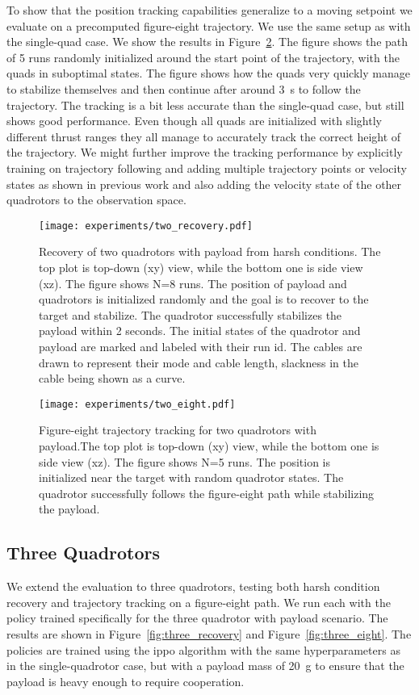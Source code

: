 To show that the position tracking capabilities generalize to a moving setpoint we evaluate on a precomputed figure-eight trajectory. We use the same setup as with the single-quad case. We show the results in Figure~\ref{fig:two_eight}. The figure shows the path of 5 runs randomly initialized around the start point of the trajectory, with the quads in suboptimal states. The figure shows how the quads very quickly manage to stabilize themselves and then continue after around 3~s to follow the trajectory. The tracking is a bit less accurate than the single-quad case, but still shows good performance. Even though all quads are initialized with slightly different thrust ranges they all manage to accurately track the correct height of the trajectory. We might further improve the tracking performance by explicitly training on trajectory following and adding multiple trajectory points or velocity states as shown in previous work and also adding the velocity state of the other quadrotors to the observation space.
\begin{figure}[H]
    \centering
    \texttt{[image: experiments/two\_recovery.pdf]}
    \caption[Two Quadrotor Harsh Recovery Trajectory]{Recovery of two quadrotors with payload from harsh conditions. The top plot is top-down  (xy) view, while the bottom one is side view (xz).
    The figure shows N=8 runs. The position of payload and quadrotors is initialized randomly and the goal is to recover to the target and stabilize. The quadrotor successfully stabilizes the payload within 2 seconds. The initial states of the quadrotor and payload are marked and labeled with their run id. The cables are drawn to represent their mode and cable length, slackness in the cable being shown as a curve.}
    \label{fig:two_recovery}
\end{figure}
\begin{figure}[H]
    \centering
    
    \texttt{[image: experiments/two\_eight.pdf]}
    \caption[Two Quadrotor Figure-Eight Tracking]{Figure-eight trajectory tracking for two quadrotors with payload.The top plot is top-down  (xy) view, while the bottom one is side view (xz). The figure shows N=5 runs. The position is initialized near the target with random quadrotor states. The quadrotor successfully follows the figure-eight path while stabilizing the payload.}
    \label{fig:two_eight}
\end{figure}
\subsection{Three Quadrotors}
We extend the evaluation to three quadrotors, testing both harsh condition recovery and trajectory tracking on a figure-eight path. We run each with the policy trained specifically for the three quadrotor with payload scenario. The results are shown in Figure~\ref{fig:three_recovery} and Figure~\ref{fig:three_eight}. The policies are trained using the \gls{ippo} algorithm with the same hyperparameters as in the single-quadrotor case, but with a payload mass of 20~g to ensure that the payload is heavy enough to require cooperation.

